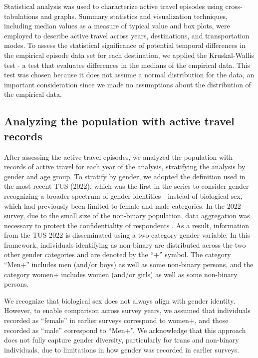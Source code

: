 \documentclass[preprint, 3p,
authoryear]{elsarticle} %
\begin{document}
Statistical analysis was used to characterize active travel episodes
using cross-tabulations and graphs. Summary statistics and visualization
techniques, including median values as a measure of typical value and
box plots, were employed to describe active travel across years,
destinations, and transportation modes. To assess the statistical
significance of potential temporal differences in the empirical episode
data set for each destination, we applied the Kruskal-Wallis test - a
test that evaluates differences in the medians of the empirical data.
This test was chosen because it does not assume a normal distribution
for the data, an important consideration since we made no assumptions
about the distribution of the empirical data.

\subsection{Analyzing the population with active travel
records}\label{analyzing-the-population-with-active-travel-records}

After assessing the active travel episodes, we analyzed the population
with records of active travel for each year of the analysis, stratifying
the analysis by gender and age group. To stratify by gender, we adopted
the definition used in the most recent TUS (2022), which was the first
in the series to consider gender - recognizing a broader spectrum of
gender identities - instead of biological sex, which had previously been
limited to female and male categories. In the 2022 survey, due to the
small size of the non-binary population, data aggregation was necessary
to protect the confidentiality of respondents
\citep{statisticscanada2025}. As a result, information from the TUS 2022
is disseminated using a two-category gender variable. In this framework,
individuals identifying as non-binary are distributed across the two
other gender categories and are denoted by the ``+'' symbol. The
category ``Men+'' includes men (and/or boys) as well as some non-binary
persons, and the category women+ includes women (and/or girls) as well
as some non-binary persons.

We recognize that biological sex does not always align with gender
identity. However, to enable comparison across survey years, we assumed
that individuals recorded as ``female'' in earlier surveys correspond to
women+, and those recorded as ``male'' correspond to ``Men+''. We
acknowledge that this approach does not fully capture gender diversity,
particularly for trans and non-binary individuals, due to limitations in
how gender was recorded in earlier surveys.
\end{document}
